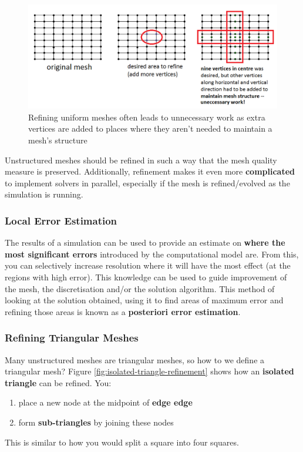 \documentclass{article}
\begin{document}
\begin{figure}
	\centering
	\includegraphics[scale=0.5]{figures/uniform-mesh-refinement.png}
	\caption{Refining uniform meshes often leads to unnecessary work as extra vertices are added to places where they aren't needed to maintain a mesh's structure}
	\label{fig:local-refinement-structured-mesh}
\end{figure}

Unstructured meshes should be refined in such a way that the mesh quality measure is preserved. Additionally, refinement makes it even more \textbf{complicated} to implement solvers in parallel, especially if the mesh is refined/evolved as the simulation is running.

\subsubsection{Local Error Estimation}

The results of a simulation can be used to provide an estimate on \textbf{where the most significant errors} introduced by the computational model are. From this, you can selectively increase resolution where it will have the most effect (at the regions with high error). This knowledge can be used to guide improvement of the mesh, the discretisation and/or the solution algorithm. This method of looking at the solution obtained, using it to find areas of maximum error and refining those areas is known as a \textbf{posteriori error estimation}.

\subsubsection{Refining Triangular Meshes}

Many unstructured meshes are triangular meshes, so how to we define a triangular mesh? Figure \ref{fig:isolated-triangle-refinement} shows how an \textbf{isolated triangle} can be refined. You:
\begin{enumerate}
	\item place a new node at the midpoint of \textbf{edge edge}
	\item form \textbf{sub-triangles} by joining these nodes
\end{enumerate}
This is similar to how you would split a square into four squares.
\end{document}
